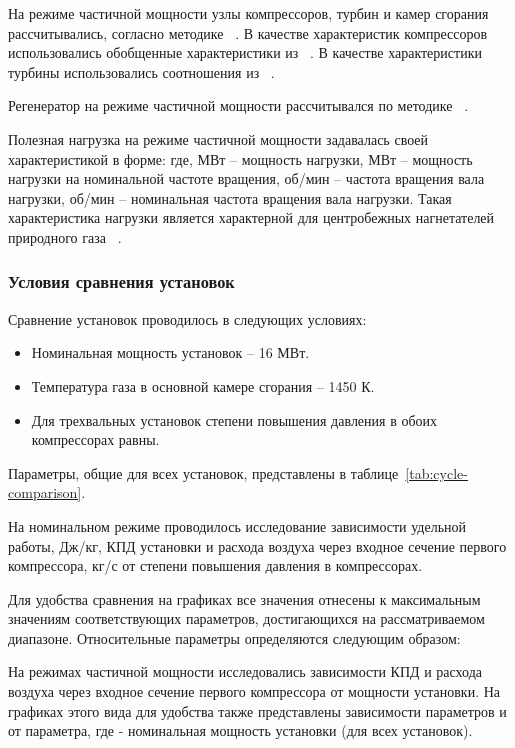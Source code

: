 На режиме частичной мощности узлы компрессоров, турбин и камер сгорания рассчитывались, согласно методике ~\cite{shlyakhtenko}.
В качестве характеристик компрессоров использовались обобщенные характеристики из ~\cite{comp_char}.
В качестве характеристики турбины использовались соотношения из ~\cite{kazandjan}.

Регенератор на режиме частичной мощности рассчитывался по методике ~\cite{heat_exchangers}.

Полезная нагрузка на режиме частичной мощности задавалась своей характеристикой в форме:
где, МВт – мощность нагрузки, МВт – мощность нагрузки на номинальной частоте вращения, об/мин –
частота вращения вала нагрузки, об/мин – номинальная частота вращения вала нагрузки. Такая характеристика нагрузки
является характерной для центробежных нагнетателей природного газа ~\cite{radial_compressors}.

\subsubsection{Условия сравнения установок}

Сравнение установок проводилось в следующих условиях:
\begin{itemize}
	\item Номинальная мощность установок – 16 МВт.
	\item Температура газа в основной камере сгорания – 1450 К.
	\item Для трехвальных установок степени повышения давления в обоих компрессорах равны.
\end{itemize}

Параметры, общие для всех установок, представлены в таблице~\ref{tab:cycle-comparison}.

На номинальном режиме проводилось исследование зависимости удельной работы, Дж/кг, КПД установки и расхода воздуха через входное сечение первого компрессора, кг/с от степени повышения давления в компрессорах. 

Для удобства сравнения на графиках все значения отнесены к максимальным значениям соответствующих параметров, достигающихся на рассматриваемом диапазоне. Относительные параметры определяются следующим образом:

На режимах частичной мощности исследовались зависимости КПД и расхода воздуха через входное сечение первого компрессора от мощности установки. На графиках этого вида для удобства также представлены зависимости параметров и от параметра, где - номинальная мощность установки (для всех установок).

